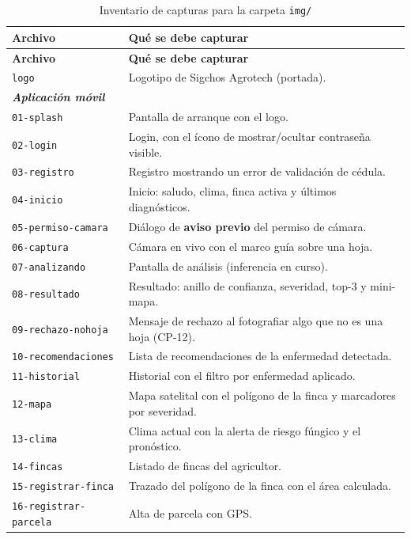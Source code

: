 \documentclass[12pt,a4paper]{article}
\begin{document}
\begin{longtable}{p{3.9cm} p{9.6cm}}
\caption{Inventario de capturas para la carpeta \texttt{img/}}
\label{tab:capturas} \\
\toprule
\bfseries Archivo & \bfseries Qué se debe capturar \\
\midrule
\endfirsthead
\toprule
\bfseries Archivo & \bfseries Qué se debe capturar \\
\midrule
\endhead
\bottomrule
\endfoot

\texttt{logo} & Logotipo de Sigchos Agrotech (portada). \\
\multicolumn{2}{l}{\textit{\textbf{Aplicación móvil}}} \\
\texttt{01-splash} & Pantalla de arranque con el logo. \\
\texttt{02-login} & Login, con el ícono de mostrar/ocultar contraseña visible. \\
\texttt{03-registro} & Registro mostrando un error de validación de cédula. \\
\texttt{04-inicio} & Inicio: saludo, clima, finca activa y últimos diagnósticos. \\
\texttt{05-permiso-camara} & Diálogo de \textbf{aviso previo} del permiso de cámara. \\
\texttt{06-captura} & Cámara en vivo con el marco guía sobre una hoja. \\
\texttt{07-analizando} & Pantalla de análisis (inferencia en curso). \\
\texttt{08-resultado} & Resultado: anillo de confianza, severidad, top-3 y mini-mapa. \\
\texttt{09-rechazo-nohoja} & Mensaje de rechazo al fotografiar algo que no es una hoja (CP-12). \\
\texttt{10-recomendaciones} & Lista de recomendaciones de la enfermedad detectada. \\
\texttt{11-historial} & Historial con el filtro por enfermedad aplicado. \\
\texttt{12-mapa} & Mapa satelital con el polígono de la finca y marcadores por severidad. \\
\texttt{13-clima} & Clima actual con la alerta de riesgo fúngico y el pronóstico. \\
\texttt{14-fincas} & Listado de fincas del agricultor. \\
\texttt{15-registrar-finca} & Trazado del polígono de la finca con el área calculada. \\
\texttt{16-registrar-parcela} & Alta de parcela con GPS. \\

\end{longtable}
\end{document}
